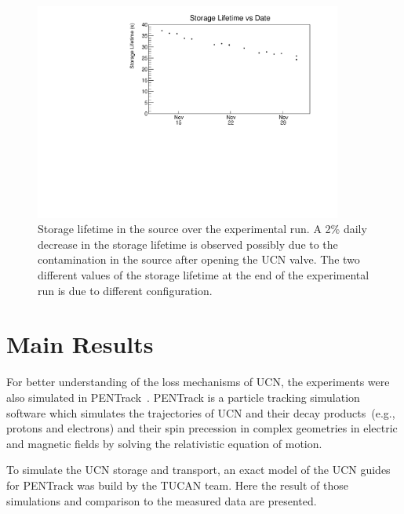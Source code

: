 \begin{figure}[h!]
  \centering
  \includegraphics[width=0.9\textwidth]{storageLifetime_vs_time.pdf}
  \caption[Storage lifetime in the source over the experimental
  run]{Storage lifetime in the source over the experimental run. A 2\%
    daily decrease in the storage lifetime is observed possibly due to
    the contamination in the source after opening the UCN valve. The
    two different values of the storage lifetime at the end of the
    experimental run is due to different configuration.}
  \label{fig:storagelifetime_overall}
\end{figure}


\section{Main Results\label{sec:pentrack}}

For better understanding of the loss mechanisms of UCN, the
experiments were also simulated in
PENTrack~\cite{schreyer2017pentrack}. PENTrack is a particle tracking
simulation software which simulates the trajectories of UCN and their
decay products~(e.g., protons and electrons) and their spin precession
in complex geometries in electric and magnetic fields by solving the
relativistic equation of motion.

To simulate the UCN storage and transport, an exact model of the UCN
guides for PENTrack was build by the TUCAN team. Here the result of
those simulations and comparison to the measured data are presented.

